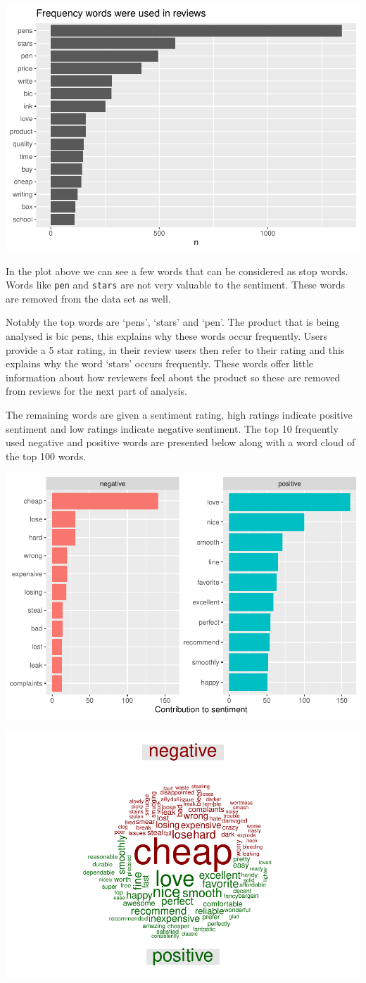 \documentclass[
  11pt,
]{article}
\begin{document}
\includegraphics[width=0.5\linewidth]{Assignment-STAT702---final_files/figure-latex/3b word frequency-1}

In the plot above we can see a few words that can be considered as stop
words. Words like \texttt{pen} and \texttt{stars} are not very valuable
to the sentiment. These words are removed from the data set as well.

Notably the top words are `pens', `stars' and `pen'. The product that is
being analysed is bic pens, this explains why these words occur
frequently. Users provide a 5 star rating, in their review users then
refer to their rating and this explains why the word `stars' occurs
frequently. These words offer little information about how reviewers
feel about the product so these are removed from reviews for the next
part of analysis.

The remaining words are given a sentiment rating, high ratings indicate
positive sentiment and low ratings indicate negative sentiment. The top
10 frequently used negative and positive words are presented below along
with a word cloud of the top 100 words.

\includegraphics[width=0.75\linewidth]{Assignment-STAT702---final_files/figure-latex/3b word sentiment-1}

\includegraphics[width=0.75\linewidth]{Assignment-STAT702---final_files/figure-latex/3b word cloud-1}
\end{document}
